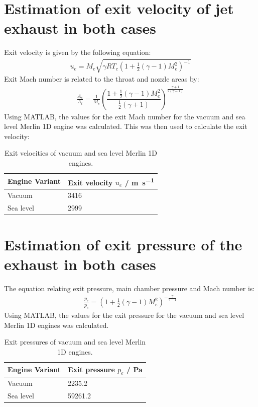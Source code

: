 \documentclass[11pt]{article}
\numberwithin{equation}{section}
\begin{document}
\section{Estimation of exit velocity of jet exhaust in both cases}
Exit velocity is given by the following equation:
\begin{gather}
    u_e = M_e \sqrt{\gamma R T_c \left(1 + \frac{1}{2}\left(\gamma - 1\right)M_e^2\right)^{-1}}
\end{gather}
Exit Mach number is related to the throat and nozzle areas by:
\begin{gather}
    \frac{A_e}{A_t} = \frac{1}{M_e}\left(\dfrac{1+\frac{1}{2}\left(\gamma - 1\right)M_e^2}{\frac{1}{2}\left(\gamma + 1\right)}\right)^{\frac{\gamma +1}{2\left(\gamma - 1\right)}}
\end{gather}
Using MATLAB, the values for the exit Mach number for the vacuum and sea level Merlin 1D engine was calculated. This was then used to calculate the exit velocity:

\begin{table}[H]
    \centering
    \begin{tabular}{@{}ll@{}}
        \toprule
        Engine Variant & Exit velocity $u_e$ / \si{\meter\per\second} \\
        \midrule
        Vacuum         & 3416                                         \\
        Sea level      & 2999                                         \\
        \bottomrule
    \end{tabular}
    \caption{Exit velocities of vacuum and sea level Merlin 1D engines.}
\end{table}
\section{Estimation of exit pressure of the exhaust in both cases}
The equation relating exit pressure, main chamber pressure and Mach number is:
\begin{gather}
    \frac{p_e}{p_c} = \left(1 + \frac{1}{2}\left(\gamma - 1\right)M_e^2\right)^{-\frac{\gamma}{\gamma - 1}}
\end{gather}
Using MATLAB, the values for the exit pressure for the vacuum and sea level Merlin 1D engines was calculated.

\begin{table}[H]
    \centering
    \begin{tabular}{@{}l l@{}}
        \toprule
        Engine Variant & {Exit pressure $p_e$ / \si{\pascal}} \\
        \midrule
        Vacuum         & 2235.2                               \\
        Sea level      & 59261.2                              \\
        \bottomrule
    \end{tabular}
    \caption{Exit pressures of vacuum and sea level Merlin 1D engines.}
\end{table}
\end{document}

